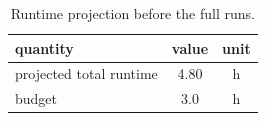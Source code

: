 \begin{table}[t]
\caption{Runtime projection before the full runs.}
\label{tab:probe}
\centering
\small
\begin{tabular}{lcc}
\toprule
quantity & value & unit \\
\midrule
projected total runtime & 4.80 & h \\
budget & 3.0 & h \\
\bottomrule
\end{tabular}
\end{table}
